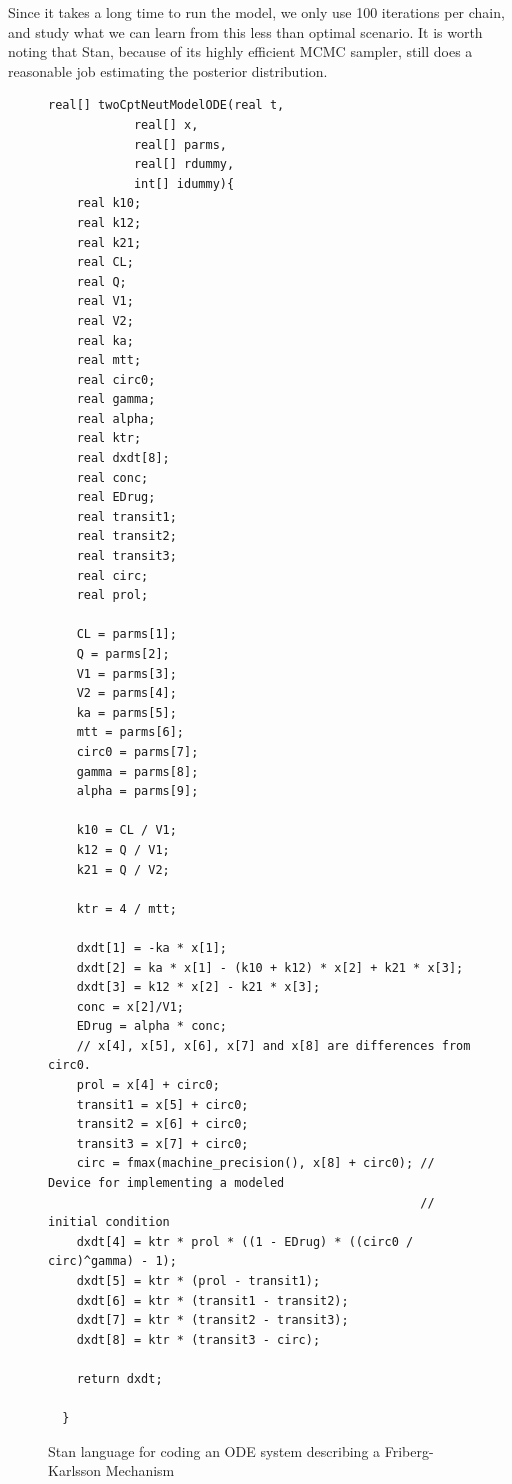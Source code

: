 \documentclass[11pt]{amsart}
\newenvironment{fmpage}[1]
     {\begin{lrbox}{\fmbox}\begin{minipage}{#1}}
     {\end{minipage}\end{lrbox}\fbox{\usebox{\fmbox}}}
\begin{document}
Since it takes a long time to run the model, we only use 100 iterations per chain, and study what we can learn from this less than optimal scenario. It is worth noting that Stan, because of its highly efficient MCMC sampler, still does a reasonable job estimating the posterior distribution.

\begin{figure}
\caption{Stan language for coding an ODE system describing a Friberg-Karlsson Mechanism}
\begin{tiny}
\begin{center}
\begin{fmpage}{\textwidth - .75in}
\begin{lstlisting}[basicstyle=\tiny\ttfamily,mathescape=true,flexiblecolumns=true,frame=single,escapeinside=`']
    real[] twoCptNeutModelODE(real t,
			real[] x,
			real[] parms,
			real[] rdummy,
			int[] idummy){
    real k10;
    real k12;
    real k21;
    real CL;
    real Q;
    real V1;
    real V2;
    real ka;
    real mtt;
    real circ0;
    real gamma;
    real alpha;
    real ktr;
    real dxdt[8];
    real conc;
    real EDrug;
    real transit1;
    real transit2;
    real transit3;
    real circ;
    real prol;

    CL = parms[1];
    Q = parms[2];
    V1 = parms[3];
    V2 = parms[4];
    ka = parms[5];
    mtt = parms[6];	
    circ0 = parms[7];
    gamma = parms[8];
    alpha = parms[9];

    k10 = CL / V1;
    k12 = Q / V1;
    k21 = Q / V2;

    ktr = 4 / mtt;
  
    dxdt[1] = -ka * x[1];
    dxdt[2] = ka * x[1] - (k10 + k12) * x[2] + k21 * x[3];
    dxdt[3] = k12 * x[2] - k21 * x[3];
    conc = x[2]/V1;
    EDrug = alpha * conc;
    // x[4], x[5], x[6], x[7] and x[8] are differences from circ0.
    prol = x[4] + circ0;
    transit1 = x[5] + circ0;
    transit2 = x[6] + circ0;
    transit3 = x[7] + circ0;
    circ = fmax(machine_precision(), x[8] + circ0); // Device for implementing a modeled 
                                                    // initial condition
    dxdt[4] = ktr * prol * ((1 - EDrug) * ((circ0 / circ)^gamma) - 1);
    dxdt[5] = ktr * (prol - transit1);
    dxdt[6] = ktr * (transit1 - transit2);
    dxdt[7] = ktr * (transit2 - transit3);
    dxdt[8] = ktr * (transit3 - circ);

    return dxdt;

  }
\end{lstlisting}
\end{fmpage}
\end{center}
\end{tiny} 
\label{FKODECode}
\end{figure}
\end{document}
